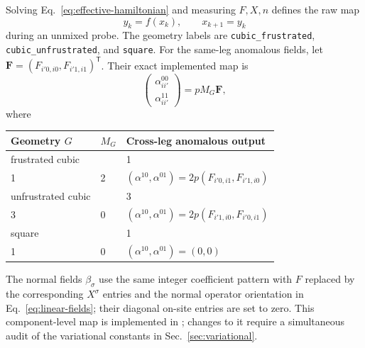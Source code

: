 \documentclass[11pt]{article}
\begin{document}
Solving Eq.~\eqref{eq:effective-hamiltonian} and measuring \(F,X,n\) defines
the raw map
\begin{equation}
  y_k=f(x_k), \qquad x_{k+1}=y_k
\label{eq:raw-map}
\end{equation}
during an unmixed probe.  The geometry labels are
\texttt{cubic\_frustrated}, \texttt{cubic\_unfrustrated}, and
\texttt{square}.  For the same-leg anomalous fields, let
\(\bm F=(F_{i'0,i0},F_{i'1,i1})^{\mathsf T}\).  Their exact implemented map is
\begin{equation}
 \begin{pmatrix}\alpha^{00}_{ii'}\\\alpha^{11}_{ii'}\end{pmatrix}
 =p M_G\bm F,
\end{equation}
where
\begin{center}
\begin{tabular}{lll}
\toprule
Geometry \(G\) & \(M_G\) & Cross-leg anomalous output
\\ \midrule
frustrated cubic
& \(\left(\begin{smallmatrix}2&1\\1&2\end{smallmatrix}\right)\)
& \((\alpha^{10},\alpha^{01})=2p(F_{i'0,i1},F_{i'1,i0})\)
\\
unfrustrated cubic
& \(\left(\begin{smallmatrix}0&3\\3&0\end{smallmatrix}\right)\)
& \((\alpha^{10},\alpha^{01})=2p(F_{i'1,i0},F_{i'0,i1})\)
\\
square
& \(\left(\begin{smallmatrix}0&1\\1&0\end{smallmatrix}\right)\)
& \((\alpha^{10},\alpha^{01})=(0,0)\)
\\ \bottomrule
\end{tabular}
\end{center}
The normal fields \(\beta_\sigma\) use the same integer coefficient pattern
with \(F\) replaced by the corresponding \(X^\sigma\) entries and the normal
operator orientation in Eq.~\eqref{eq:linear-fields}; their diagonal on-site
entries are set to zero.  This component-level map is implemented in
; changes to it require a simultaneous audit of the
variational constants in Sec.~\ref{sec:variational}.
\end{document}
